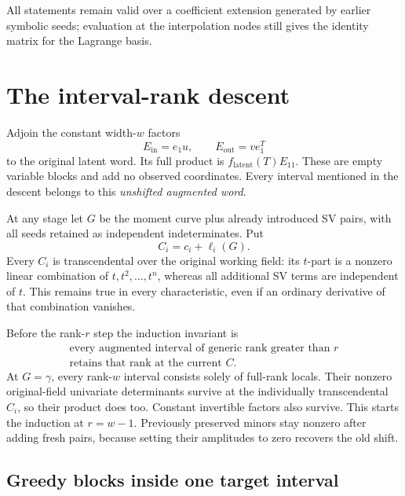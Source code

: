 All statements remain valid over a coefficient extension generated by
earlier symbolic seeds; evaluation at the interpolation nodes still
gives the identity matrix for the Lagrange basis.

\section{The interval-rank descent}

Adjoin the constant width-$w$ factors
\[
 E_{\mathrm{in}}=e_1u,\qquad E_{\mathrm{out}}=ve_1^T
\]
to the original latent word. Its full product is
$f_{\mathrm{latent}}(T)E_{11}$. These are empty variable blocks and
add no observed coordinates. Every interval mentioned in the descent
belongs to this \emph{unshifted augmented word}.

At any stage let $G$ be the moment curve plus already introduced
SV pairs, with all seeds retained as independent indeterminates. Put
\[
 C_i=c_i+\ell_i(G).
\]
Every $C_i$ is transcendental over the original working field: its
$t$-part is a nonzero linear combination of $t,t^2,\ldots,t^n$,
whereas all additional SV terms are independent of $t$.
This remains true in every characteristic, even if an ordinary
derivative of that combination vanishes.

Before the rank-$r$ step the induction invariant is
\begin{equation}\label{eq:invariant}
 \begin{gathered}
 \text{every augmented interval of generic rank greater than }r\\
 \text{retains that rank at the current }C.
 \end{gathered}
\end{equation}
At $G=\gamma$, every rank-$w$ interval consists solely of full-rank
locals. Their nonzero original-field univariate determinants survive
at the individually transcendental $C_i$, so their product does too.
Constant invertible factors also survive. This starts the induction
at $r=w-1$. Previously preserved minors stay nonzero after adding
fresh pairs, because setting their amplitudes to zero recovers the
old shift.

\subsection{Greedy blocks inside one target interval}

